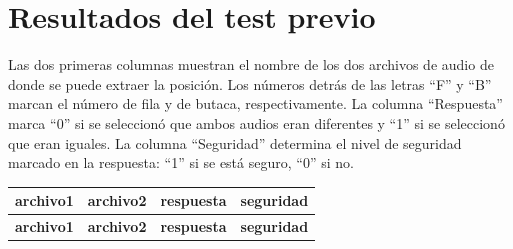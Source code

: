\documentclass[11pt,a4paper]{book}
\begin{document}
\section{Resultados del test previo}
    Las dos primeras columnas muestran el nombre de los dos archivos de audio de donde se puede extraer la posición. Los números detrás de las letras ``F'' y ``B'' marcan el número de fila y de butaca, respectivamente. La columna ``Respuesta'' marca ``0'' si se seleccionó que ambos audios eran diferentes y ``1'' si se seleccionó que eran iguales. La columna ``Seguridad'' determina el nivel de seguridad marcado en la respuesta: ``1'' si se está seguro, ``0'' si no.
    \scriptsize
    \begin{longtable}[c]{|c|c|c|c|}
		\hline
		\textbf{archivo1}&\textbf{archivo2}&\textbf{respuesta}&\textbf{seguridad}\\ \hline
		\endfirsthead
		\hline
		\textbf{archivo1}&\textbf{archivo2}&\textbf{respuesta}&\textbf{seguridad}\\ \hline
		\endhead
		

\end{longtable}
\end{document}
